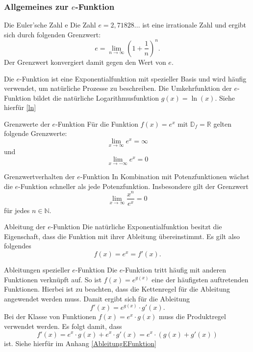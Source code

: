 \subsubsection{Allgemeines zur $e$-Funktion}
\begin{satz}{Die Euler'sche Zahl e}{}
Die Zahl $e=2,71828...$ ist eine irrationale Zahl und ergibt sich durch folgenden Grenzwert: $$e= \lim_{n\longrightarrow \infty} \left(1+ \dfrac{1}{n}\right)^n.$$ Der Grenzwert konvergiert damit gegen den Wert von $e$.   
\end{satz}
Die $e$-Funktion ist eine Exponentialfunktion mit spezieller Basis und wird häufig verwendet, um natürliche Prozesse zu beschreiben. Die Umkehrfunktion der $e$-Funktion bildet die natürliche Logarithmusfunktion $g(x) = \ln{(x)}$. Siehe hierfür \ref{ln}
\begin{center}
\end{center}
\begin{bem}{Grenzwerte der $e$-Funktion}{}
Für die Funktion $f(x) = e^x$ mit $\mathds{D}_f = \mathds{R}$ gelten folgende Grenzwerte: $$\lim_{x\longrightarrow \infty} e^x = \infty$$ und $$\lim_{x\longrightarrow -\infty} e^x = 0$$ 
\end{bem}
\begin{satz}{Grenzwertverhalten der $e$-Funktion}{}
In Kombination mit Potenzfunktionen wächst die $e$-Funktion schneller als jede Potenzfunktion. Insbesondere gilt der Grenzwert $$\lim_{x\longrightarrow \infty} \dfrac{x^n}{e^x} = 0$$ für jedes $n\in \mathds{N}$.
\end{satz}
\begin{satz}{Ableitung der $e$-Funktion}{}
Die natürliche Exponentialfunktion besitzt die Eigenschaft, dass die Funktion mit ihrer Ableitung übereinstimmt. Es gilt also folgendes $$f(x) = e^x = f'(x).$$
\end{satz}
\begin{satz}{Ableitungen spezieller $e$-Funktion}{}
Die $e$-Funktion tritt häufig mit anderen Funktionen verknüpft auf. So ist $f(x) = e^{g(x)}$ eine der häufigsten auftretenden Funktionen. Hierbei ist zu beachten, dass die Kettenregel für die Ableitung angewendet werden muss. Damit ergibt sich für die Ableitung $$f'(x) = e^{g(x)} \cdot g'(x).$$  Bei der Klasse von Funktionen $f(x) = e^x \cdot g(x)$ muss die Produktregel verwendet werden. Es folgt damit, dass $$f'(x) = e^x \cdot g(x) + e^x \cdot g'(x) = e^x\cdot (g(x)+ g'(x))$$ ist. Siehe hierfür im Anhang \ref{AbleitungEFunktion}
\end{satz}
